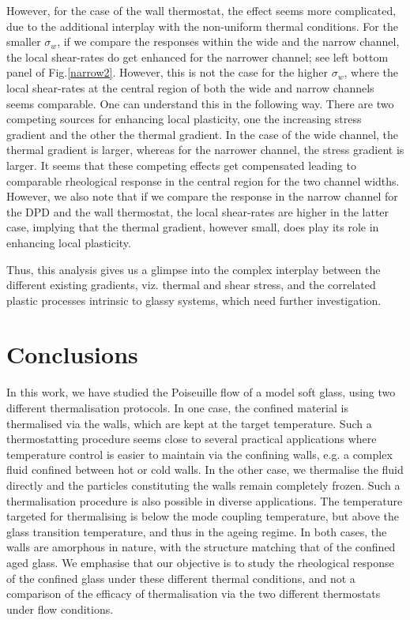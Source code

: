 However, for the case of the wall thermostat, the effect seems more complicated, due to the additional interplay with the non-uniform thermal conditions. For the smaller $\sigma_w$, if we compare the responses within the wide and the narrow channel,  the local shear-rates do get enhanced for the narrower channel; see left bottom panel of Fig.\ref{narrow2}. However, this is not the case for the higher $\sigma_w$, where the local shear-rates at the central region of both the wide and narrow channels seems comparable. One can understand this in the following way. There are two competing sources for enhancing local plasticity, one the increasing stress gradient and the other the thermal gradient. In the case of the wide channel, the thermal gradient is larger, whereas for the narrower channel, the stress gradient is larger. It seems that these competing effects get compensated leading to comparable rheological response in the central region for the two channel widths.  However, we also note that if we compare the response in the narrow channel for the DPD and the wall thermostat, the local shear-rates are higher in the latter case, implying that the thermal gradient, however small, does play its role in enhancing local plasticity.

Thus, this analysis gives us a glimpse into the complex interplay between the different existing gradients, viz. thermal and shear stress, and the correlated plastic processes intrinsic to glassy systems, which need further investigation.

\section{Conclusions}

In this work, we have studied the Poiseuille flow of a model soft glass, using two different thermalisation protocols. In one case, the confined material is thermalised via the walls, which are kept at the target temperature. Such a thermostatting procedure seems close to several practical applications where temperature control is easier to maintain via the confining walls, e.g. a complex fluid confined between hot or cold walls. In the other case, we thermalise the fluid directly and the particles constituting the walls remain completely frozen. Such a thermalisation procedure is also possible in diverse applications. The temperature targeted for thermalising is below the mode coupling temperature, but above the glass transition temperature, and thus in the ageing regime. In both cases, the walls are amorphous in nature, with the structure matching that of the confined aged glass. We emphasise that our objective is to study the rheological response of the confined glass under these different thermal conditions, and not a comparison of the efficacy of thermalisation via the two different thermostats under flow conditions.

